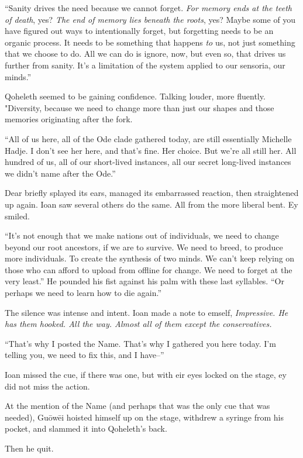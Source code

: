 ``Sanity drives the need because we cannot forget. \emph{For memory ends at the teeth of death}, yes? \emph{The end of memory lies beneath the roots}, yes? Maybe some of you have figured out ways to intentionally forget, but forgetting needs to be an organic process. It needs to be something that happens \emph{to} us, not just something that we choose to do. All we can do is ignore, now, but even so, that drives us further from sanity. It's a limitation of the system applied to our sensoria, our minds.''

Qoheleth seemed to be gaining confidence. Talking louder, more fluently. "Diversity, because we need to change more than just our shapes and those memories originating after the fork.

``All of us here, all of the Ode clade gathered today, are still essentially Michelle Hadje. I don't see her here, and that's fine. Her choice. But we're all still her. All hundred of us, all of our short-lived instances, all our secret long-lived instances we didn't name after the Ode.''

Dear briefly splayed its ears, managed its embarrassed reaction, then straightened up again. Ioan saw several others do the same. All from the more liberal bent. Ey smiled.

``It's not enough that we make nations out of individuals, we need to change beyond our root ancestors, if we are to survive. We need to breed, to produce more individuals. To create the synthesis of two minds. We can't keep relying on those who can afford to upload from offline for change. We need to forget at the very least.'' He pounded his fist against his palm with these last syllables. ``Or perhaps we need to learn how to die again.''

The silence was intense and intent. Ioan made a note to emself, \emph{Impressive. He has them hooked. All the way. Almost all of them except the conservatives.}

``That's why I posted the Name. That's why I gathered you here today. I'm telling you, we need to fix this, and I have--''

Ioan missed the cue, if there was one, but with eir eyes locked on the stage, ey did not miss the action.

At the mention of the Name (and perhaps that was the only cue that was needed), Guōwēi hoisted himself up on the stage, withdrew a syringe from his pocket, and slammed it into Qoheleth's back.

Then he quit.

